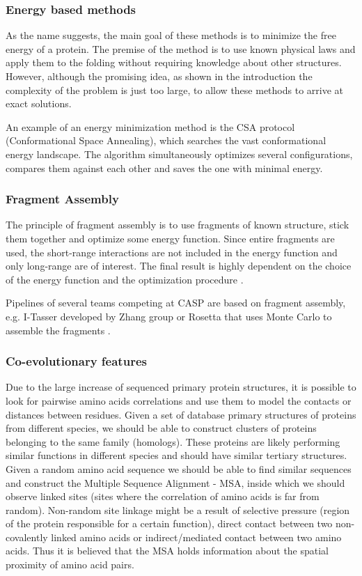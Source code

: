 \subsubsection{Energy based methods}

As the name suggests, the main goal of these methods is to minimize the free energy of a protein. 
The premise of the method is to use known physical laws and apply them to the folding without requiring knowledge about other structures. 
However, although the promising idea, as shown in the introduction the complexity of the problem is just too large, to allow these methods to arrive at exact solutions.

An example of an energy minimization method is the CSA protocol \cite{csa} (Conformational Space Annealing), which searches the vast conformational energy landscape. 
The algorithm simultaneously optimizes several configurations, compares them against each other and saves the one with minimal energy.

\subsubsection{Fragment Assembly}

The principle of fragment assembly is to use fragments of known structure, stick them together and optimize some energy function. 
Since entire fragments are used, the short-range interactions are not included in the energy function and only long-range are of interest. 
The final result is highly dependent on the choice of the energy function and the optimization procedure \cite{fragments}.

Pipelines of several teams competing at CASP are based on fragment assembly, e.g. I-Tasser developed by Zhang group \cite{zhang} or Rosetta that uses Monte Carlo to assemble the fragments \cite{rosetta}.

\subsubsection{Co-evolutionary features}

Due to the large increase of sequenced primary protein structures, it is possible to look for pairwise amino acids correlations and use them to model the contacts or distances between residues.
Given a set of database primary structures of proteins from different species, we should be able to construct clusters of proteins belonging to the same family (homologs). 
These proteins are likely performing similar functions in different species and should have similar tertiary structures. 
Given a random amino acid sequence we should be able to find similar sequences and construct the Multiple Sequence Alignment - MSA, inside which we should observe linked sites (sites where the correlation of amino acids is far from random). 
Non-random site linkage might be a result of selective pressure (region of the protein responsible for a certain function), direct contact between two non-covalently linked amino acids or indirect/mediated contact between two amino acids. 
Thus it is believed that the MSA holds information about the spatial proximity of amino acid pairs.

